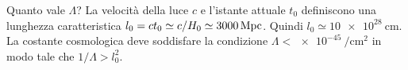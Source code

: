 Quanto vale $\Lambda$?  La velocità della luce $c$ e l'istante attuale $t_0$
definiscono una lunghezza caratteristica
$l_0 = c t_0 \simeq c/H_0 \simeq \SI{3000}{\mega pc}$.  Quindi
$l_0 \simeq \SI{10e28}{\centi\metre}$.  La costante cosmologica deve soddisfare
la condizione
$\Lambda < \SI{e-45}{\per\centi\metre\squared}$ in modo
tale che $1/\Lambda > l_0^2$.
